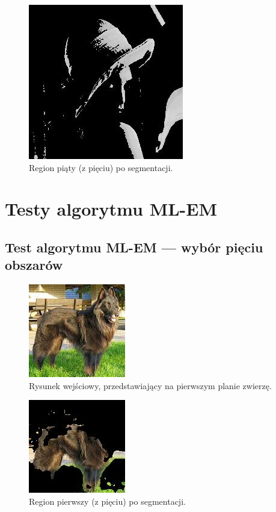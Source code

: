 \documentclass[10pt]{llncs}
\begin{document}
\FloatBarrier

\begin{figure}[h!]
  \centering
  \includegraphics[scale=.8, clip]{img/02_region_05.jpg}
	\caption[]
  {Region piąty (z pięciu) po segmentacji.}
\end{figure}

\FloatBarrier

\section{Testy algorytmu ML-EM}

\subsection{Test algorytmu ML-EM --- wybór pięciu obszarów}

\FloatBarrier

\begin{figure}[h!]
  \centering
  \includegraphics[scale=.8, clip]{img/images.jpg}
	\caption[]
  {Rysunek wejściowy, przedstawiający na pierwszym planie zwierzę.}
\end{figure}

\FloatBarrier

\begin{figure}[h!]
  \centering
  \includegraphics[scale=.8, clip]{img/images_k5_0.jpg}
	\caption[]
  {Region pierwszy (z pięciu) po segmentacji.}
\end{figure}
\end{document}
